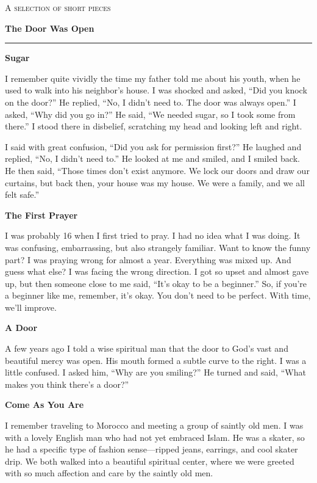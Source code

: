 \documentclass[11pt,twoside,openany]{book}
\newcommand{\piecehead}[1]{%
  \Needspace{6\baselineskip}%
  \par\addvspace{1.2\baselineskip}%
  {\noindent\large\bfseries #1\par}%
  \vspace{-0.15\baselineskip}%
}
\begin{document}
\thispagestyle{plain}
\vspace*{0.42in}
{\noindent\small\scshape A selection of short pieces\par}
\vspace{0.4in}
{\noindent\Huge\bfseries The Door Was Open\par}
\vspace{0.2in}
\noindent\rule{0.75in}{0.4pt}
\vspace{0.26in}

\piecehead{Sugar}
I remember quite vividly the time my father told me about his youth, when he used to walk into his neighbor's house. I was shocked and asked, ``Did you knock on the door?'' He replied, ``No, I didn't need to. The door was always open.'' I asked, ``Why did you go in?'' He said, ``We needed sugar, so I took some from there.'' I stood there in disbelief, scratching my head and looking left and right.

I said with great confusion, ``Did you ask for permission first?'' He laughed and replied, ``No, I didn't need to.'' He looked at me and smiled, and I smiled back. He then said, ``Those times don't exist anymore. We lock our doors and draw our curtains, but back then, your house was my house. We were a family, and we all felt safe.''

\piecehead{The First Prayer}
I was probably 16 when I first tried to pray. I had no idea what I was doing. It was confusing, embarrassing, but also strangely familiar. Want to know the funny part? I was praying wrong for almost a year. Everything was mixed up. And guess what else? I was facing the wrong direction. I got so upset and almost gave up, but then someone close to me said, ``It's okay to be a beginner.'' So, if you're a beginner like me, remember, it's okay. You don't need to be perfect. With time, we'll improve.

\piecehead{A Door}
A few years ago I told a wise spiritual man that the door to God's vast and beautiful mercy was open. His mouth formed a subtle curve to the right. I was a little confused. I asked him, ``Why are you smiling?'' He turned and said, ``What makes you think there's a door?''

\piecehead{Come As You Are}
I remember traveling to Morocco and meeting a group of saintly old men. I was with a lovely English man who had not yet embraced Islam. He was a skater, so he had a specific type of fashion sense---ripped jeans, earrings, and cool skater drip. We both walked into a beautiful spiritual center, where we were greeted with so much affection and care by the saintly old men.
\end{document}
